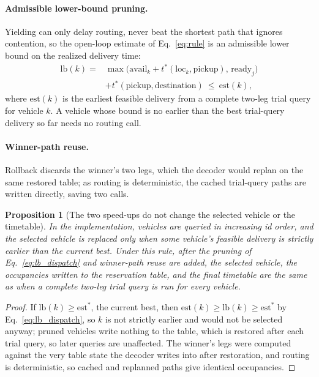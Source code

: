 \documentclass[preprint,review,12pt,authoryear]{elsarticle}
\newtheorem{prop}{Proposition}
\begin{document}
\paragraph{Admissible lower-bound pruning.}
Yielding can only delay routing, never beat the shortest path that ignores contention, so the open-loop estimate of Eq.~\eqref{eq:rule} is an admissible lower bound on the realized delivery time:
\begin{equation}
\label{eq:lb_dispatch}
\begin{split}
\mathrm{lb}(k)={}&\max\bigl(\mathrm{avail}_k+t^{*}(\mathrm{loc}_k,\text{pickup}),\,\mathrm{ready}_j\bigr)\\
&+t^{*}(\text{pickup},\text{destination})\ \le\ \mathrm{est}(k),
\end{split}
\end{equation}
where $\mathrm{est}(k)$ is the earliest feasible delivery from a complete two-leg trial query for vehicle $k$.
A vehicle whose bound is no earlier than the best trial-query delivery so far needs no routing call.

\paragraph{Winner-path reuse.}
Rollback discards the winner's two legs, which the decoder would replan on the same restored table; as routing is deterministic, the cached trial-query paths are written directly, saving two calls.

\begin{prop}[The two speed-ups do not change the selected vehicle or the timetable]
  \label{prop:speedup_equiv}
  In the implementation, vehicles are queried in increasing id order, and the selected vehicle is replaced only when some vehicle's feasible delivery is strictly earlier than the current best.
  Under this rule, after the pruning of Eq.~\eqref{eq:lb_dispatch} and winner-path reuse are added, the selected vehicle, the occupancies written to the reservation table, and the final timetable are the same as when a complete two-leg trial query is run for every vehicle.
\end{prop}

\begin{proof}
If $\mathrm{lb}(k)\ge\mathrm{est}^{\ast}$, the current best, then $\mathrm{est}(k)\ge\mathrm{lb}(k)\ge\mathrm{est}^{\ast}$ by Eq.~\eqref{eq:lb_dispatch}, so $k$ is not strictly earlier and would not be selected anyway; pruned vehicles write nothing to the table, which is restored after each trial query, so later queries are unaffected.
The winner's legs were computed against the very table state the decoder writes into after restoration, and routing is deterministic, so cached and replanned paths give identical occupancies.
\end{proof}
\end{document}
